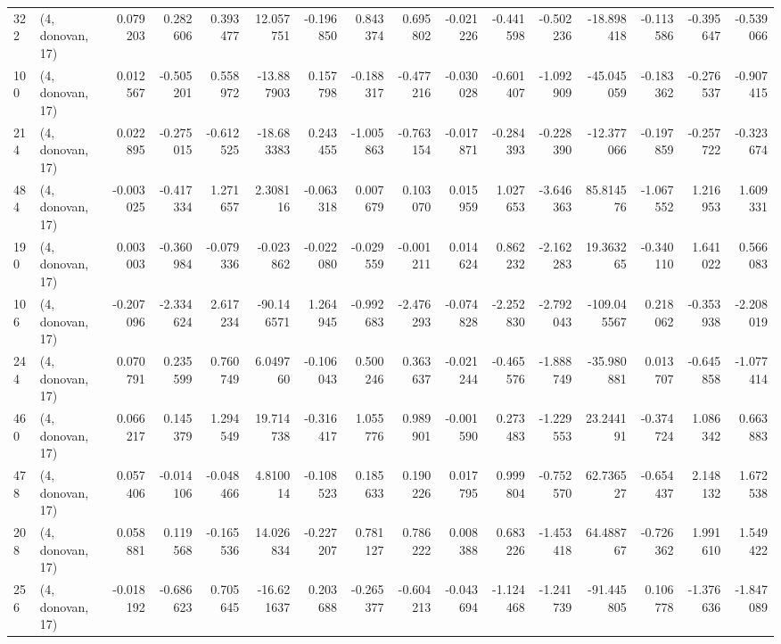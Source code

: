 \begin{tabular}{llrrrrrrrrrrrrrr}
322 &  (4, donovan, 17) &   0.079203 &  0.282606 &  0.393477 &   12.057751 & -0.196850 &   0.843374 &  0.695802 & -0.021226 & -0.441598 & -0.502236 &  -18.898418 & -0.113586 & -0.395647 & -0.539066 \\
100 &  (4, donovan, 17) &   0.012567 & -0.505201 &  0.558972 &  -13.887903 &  0.157798 &  -0.188317 & -0.477216 & -0.030028 & -0.601407 & -1.092909 &  -45.045059 & -0.183362 & -0.276537 & -0.907415 \\
214 &  (4, donovan, 17) &   0.022895 & -0.275015 & -0.612525 &  -18.683383 &  0.243455 &  -1.005863 & -0.763154 & -0.017871 & -0.284393 & -0.228390 &  -12.377066 & -0.197859 & -0.257722 & -0.323674 \\
484 &  (4, donovan, 17) &  -0.003025 & -0.417334 &  1.271657 &    2.308116 & -0.063318 &   0.007679 &  0.103070 &  0.015959 &  1.027653 & -3.646363 &   85.814576 & -1.067552 &  1.216953 &  1.609331 \\
190 &  (4, donovan, 17) &   0.003003 & -0.360984 & -0.079336 &   -0.023862 & -0.022080 &  -0.029559 & -0.001211 &  0.014624 &  0.862232 & -2.162283 &   19.363265 & -0.340110 &  1.641022 &  0.566083 \\
106 &  (4, donovan, 17) &  -0.207096 & -2.334624 &  2.617234 &  -90.146571 &  1.264945 &  -0.992683 & -2.476293 & -0.074828 & -2.252830 & -2.792043 & -109.045567 &  0.218062 & -0.353938 & -2.208019 \\
244 &  (4, donovan, 17) &   0.070791 &  0.235599 &  0.760749 &    6.049760 & -0.106043 &   0.500246 &  0.363637 & -0.021244 & -0.465576 & -1.888749 &  -35.980881 &  0.013707 & -0.645858 & -1.077414 \\
460 &  (4, donovan, 17) &   0.066217 &  0.145379 &  1.294549 &   19.714738 & -0.316417 &   1.055776 &  0.989901 & -0.001590 &  0.273483 & -1.229553 &   23.244191 & -0.374724 &  1.086342 &  0.663883 \\
478 &  (4, donovan, 17) &   0.057406 & -0.014106 & -0.048466 &    4.810014 & -0.108523 &   0.185633 &  0.190226 &  0.017795 &  0.999804 & -0.752570 &   62.736527 & -0.654437 &  2.148132 &  1.672538 \\
208 &  (4, donovan, 17) &   0.058881 &  0.119568 & -0.165536 &   14.026834 & -0.227207 &   0.781127 &  0.786222 &  0.008388 &  0.683226 & -1.453418 &   64.488767 & -0.726362 &  1.991610 &  1.549422 \\
256 &  (4, donovan, 17) &  -0.018192 & -0.686623 &  0.705645 &  -16.621637 &  0.203688 &  -0.265377 & -0.604213 & -0.043694 & -1.124468 & -1.241739 &  -91.445805 &  0.106778 & -1.376636 & -1.847089 \\

\end{tabular}
